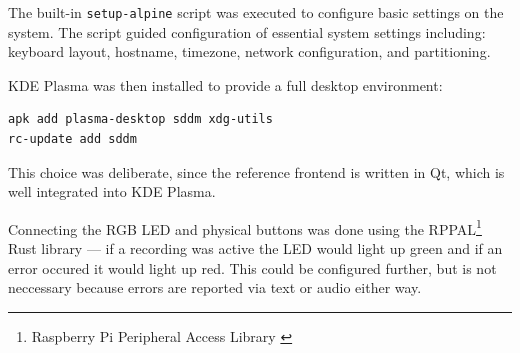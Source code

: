 The built-in \texttt{setup-alpine} script was executed to configure basic settings on the system.
The script guided configuration of essential system settings including:
keyboard layout, hostname, timezone, network configuration, and partitioning.

KDE Plasma was then installed to provide a full desktop environment:
\begin{verbatim}
apk add plasma-desktop sddm xdg-utils
rc-update add sddm
\end{verbatim}
This choice was deliberate, since the reference frontend is written in Qt,
which is well integrated into KDE Plasma.

Connecting the RGB LED and physical buttons was done using the RPPAL\footnote{Raspberry Pi Peripheral Access Library \cite{rppal}} Rust library ---
if a recording was active the LED would light up green and if an error occured it would light up red.
This could be configured further, but is not neccessary because errors are reported via text or audio either way.